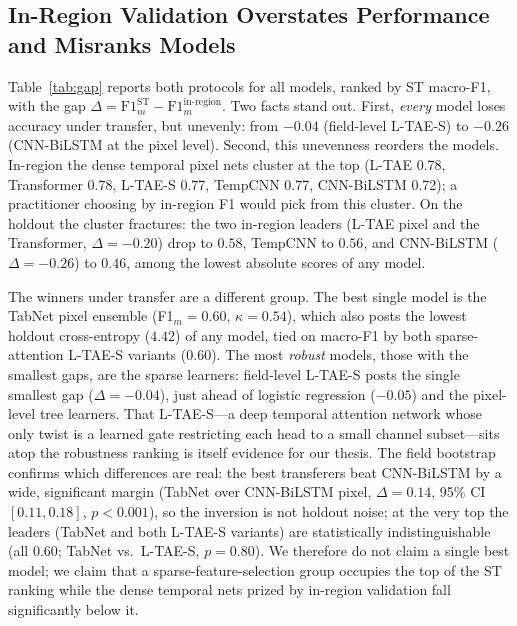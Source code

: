 \documentclass[journal]{IEEEtran}
\begin{document}
\subsection{In-Region Validation Overstates Performance and Misranks Models}
Table~\ref{tab:gap} reports both protocols for all models, ranked by ST macro-F1, with the gap $\Delta=\text{F1}_m^{\text{ST}}-\text{F1}_m^{\text{in-region}}$. Two facts stand out. First, \emph{every} model loses accuracy under transfer, but unevenly: from $-0.04$ (field-level L-TAE-S) to $-0.26$ (CNN-BiLSTM at the pixel level). Second, this unevenness reorders the models. In-region the dense temporal pixel nets cluster at the top (L-TAE 0.78, Transformer 0.78, L-TAE-S 0.77, TempCNN 0.77, CNN-BiLSTM 0.72); a practitioner choosing by in-region F1 would pick from this cluster. On the holdout the cluster fractures: the two in-region leaders (L-TAE pixel and the Transformer, $\Delta=-0.20$) drop to $0.58$, TempCNN to $0.56$, and CNN-BiLSTM ($\Delta=-0.26$) to $0.46$, among the lowest absolute scores of any model.

The winners under transfer are a different group. The best single model is the TabNet pixel ensemble (F1$_m=0.60$, $\kappa=0.54$), which also posts the lowest holdout cross-entropy ($4.42$) of any model, tied on macro-F1 by both sparse-attention L-TAE-S variants ($0.60$). The most \emph{robust} models, those with the smallest gaps, are the sparse learners: field-level L-TAE-S posts the single smallest gap ($\Delta=-0.04$), just ahead of logistic regression ($-0.05$) and the pixel-level tree learners. That L-TAE-S---a deep temporal attention network whose only twist is a learned gate restricting each head to a small channel subset---sits atop the robustness ranking is itself evidence for our thesis. The field bootstrap confirms which differences are real: the best transferers beat CNN-BiLSTM by a wide, significant margin (TabNet over CNN-BiLSTM pixel, $\Delta=0.14$, 95\% CI $[0.11,0.18]$, $p<0.001$), so the inversion is not holdout noise; at the very top the leaders (TabNet and both L-TAE-S variants) are statistically indistinguishable (all $0.60$; TabNet vs.\ L-TAE-S, $p=0.80$). We therefore do not claim a single best model; we claim that a sparse-feature-selection group occupies the top of the ST ranking while the dense temporal nets prized by in-region validation fall significantly below it.
\end{document}
